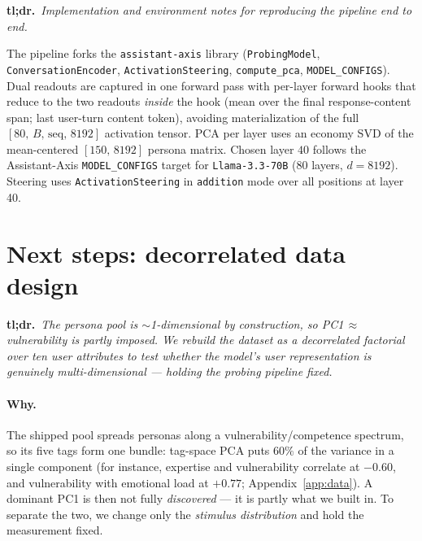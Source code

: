 \documentclass{article}
\begin{document}
\noindent\textbf{tl;dr.}~\emph{Implementation and environment notes for reproducing
the pipeline end to end.}\par\medskip
The pipeline forks the \texttt{assistant-axis} library
(\texttt{ProbingModel}, \texttt{ConversationEncoder}, \texttt{ActivationSteering},
\texttt{compute\_pca}, \texttt{MODEL\_CONFIGS}). Dual readouts are captured in one
forward pass with per-layer forward hooks that reduce to the two readouts
\emph{inside} the hook (mean over the final response-content span; last user-turn
content token), avoiding materialization of the full
$[80,\,B,\,\text{seq},\,8192]$ activation tensor. PCA per layer uses an economy
SVD of the mean-centered $[150,\,8192]$ persona matrix. Chosen layer $40$ follows
the Assistant-Axis \texttt{MODEL\_CONFIGS} target for \texttt{Llama-3.3-70B}
($80$ layers, $d{=}8192$). Steering uses \texttt{ActivationSteering} in
\texttt{addition} mode over all positions at layer 40.

\section{Next steps: decorrelated data design}\label{app:decorr}
\noindent\textbf{tl;dr.}~\emph{The persona pool is $\sim$1-dimensional by construction,
so PC1$\,\approx\,$vulnerability is partly imposed. We rebuild the dataset as a
\emph{decorrelated factorial} over ten user attributes to test whether the model's user
representation is genuinely multi-dimensional --- holding the probing pipeline fixed.}\par\medskip

\paragraph{Why.} The shipped pool spreads personas along a vulnerability/competence
spectrum, so its five tags form one bundle: tag-space PCA puts $60\%$ of the variance in
a single component (for instance, expertise and vulnerability correlate at $-0.60$, and
vulnerability with emotional load at $+0.77$; Appendix~\ref{app:data}). A dominant PC1
is then not fully \emph{discovered} --- it is
partly what we built in. To separate the two, we change only the \emph{stimulus
distribution} and hold the measurement fixed.
\end{document}
